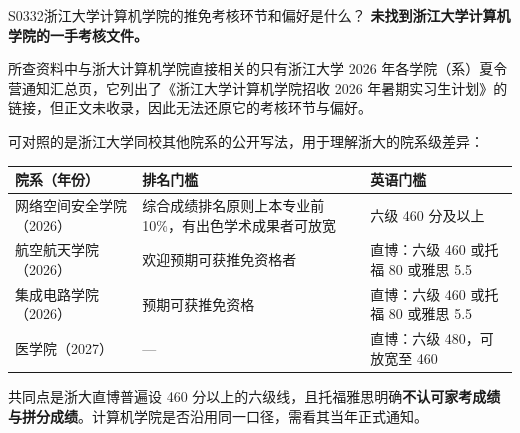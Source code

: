 \begin{qa}{S0332}{浙江大学计算机学院的推免考核环节和偏好是什么？}
\textbf{未找到浙江大学计算机学院的一手考核文件。}

所查资料中与浙大计算机学院直接相关的只有浙江大学 2026 年各学院（系）夏令营通知汇总页，它列出了《浙江大学计算机学院招收 2026 年暑期实习生计划》的链接，但正文未收录，因此无法还原它的考核环节与偏好。

可对照的是浙江大学同校其他院系的公开写法，用于理解浙大的院系级差异：

\par\vspace{2pt}\nobreak\begin{center}\footnotesize
\begin{tabularx}{\textwidth}{>{\raggedright\arraybackslash}X>{\raggedright\arraybackslash}X>{\raggedright\arraybackslash}X}
\toprule
\textbf{院系（年份）} & \textbf{排名门槛} & \textbf{英语门槛} \\ \midrule
网络空间安全学院（2026） & 综合成绩排名原则上本专业前 10\%，有出色学术成果者可放宽 & 六级 460 分及以上 \\
航空航天学院（2026） & 欢迎预期可获推免资格者 & 直博：六级 460 或托福 80 或雅思 5.5 \\
集成电路学院（2026） & 预期可获推免资格 & 直博：六级 460 或托福 80 或雅思 5.5 \\
医学院（2027） & — & 直博：六级 480，可放宽至 460 \\
\bottomrule
\end{tabularx}
\end{center}\vspace{2pt}\par

共同点是浙大直博普遍设 460 分以上的六级线，且托福雅思明确\textbf{不认可家考成绩与拼分成绩}。计算机学院是否沿用同一口径，需看其当年正式通知。
\end{qa}

